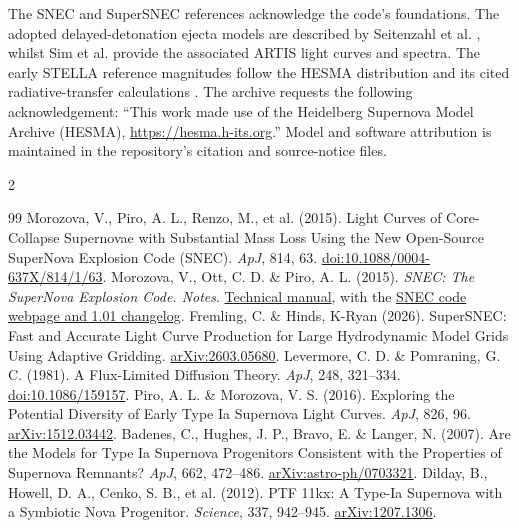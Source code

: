 \documentclass[11pt,a4paper]{article}
\begin{document}
The SNEC \cite{morozova2015,snecmanual} and SuperSNEC \cite{supersnec2026} references acknowledge the code's foundations. The adopted delayed-detonation ejecta models are described by Seitenzahl et al. \cite{seitenzahl2013}, whilst Sim et al. \cite{sim2013} provide the associated ARTIS light curves and spectra. The early STELLA reference magnitudes follow the HESMA distribution and its cited radiative-transfer calculations \cite{blinnikov2006,hesma2017}. The archive requests the following acknowledgement: ``This work made use of the Heidelberg Supernova Model Archive (HESMA), \href{https://hesma.h-its.org}{https://hesma.h-its.org}.'' Model and software attribution is maintained in the repository's citation and source-notice files.

{\fontsize{8.0}{9.3}\selectfont
\begin{multicols}{2}
\begin{thebibliography}{99}\setlength{\itemsep}{0em}
 Morozova, V., Piro, A. L., Renzo, M., et al. (2015). Light Curves of Core-Collapse Supernovae with Substantial Mass Loss Using the New Open-Source SuperNova Explosion Code (SNEC). \textit{ApJ}, 814, 63. \href{https://doi.org/10.1088/0004-637X/814/1/63}{doi:10.1088/0004-637X/814/1/63}.
 Morozova, V., Ott, C. D. \& Piro, A. L. (2015). \textit{SNEC: The SuperNova Explosion Code. Notes}. \href{https://stellarcollapse.org/codes/snec_notes-1.00.pdf}{Technical manual}, with the \href{https://stellarcollapse.org/index.php/SNEC.html}{SNEC code webpage and 1.01 changelog}.
 Fremling, C. \& Hinds, K-Ryan (2026). SuperSNEC: Fast and Accurate Light Curve Production for Large Hydrodynamic Model Grids Using Adaptive Gridding. \href{https://arxiv.org/abs/2603.05680}{arXiv:2603.05680}.
 Levermore, C. D. \& Pomraning, G. C. (1981). A Flux-Limited Diffusion Theory. \textit{ApJ}, 248, 321--334. \href{https://doi.org/10.1086/159157}{doi:10.1086/159157}.
 Piro, A. L. \& Morozova, V. S. (2016). Exploring the Potential Diversity of Early Type Ia Supernova Light Curves. \textit{ApJ}, 826, 96. \href{https://arxiv.org/abs/1512.03442}{arXiv:1512.03442}.
 Badenes, C., Hughes, J. P., Bravo, E. \& Langer, N. (2007). Are the Models for Type Ia Supernova Progenitors Consistent with the Properties of Supernova Remnants? \textit{ApJ}, 662, 472--486. \href{https://arxiv.org/abs/astro-ph/0703321}{arXiv:astro-ph/0703321}.
 Dilday, B., Howell, D. A., Cenko, S. B., et al. (2012). PTF 11kx: A Type-Ia Supernova with a Symbiotic Nova Progenitor. \textit{Science}, 337, 942--945. \href{https://arxiv.org/abs/1207.1306}{arXiv:1207.1306}.

\end{thebibliography}
\end{multicols}}
\end{document}
